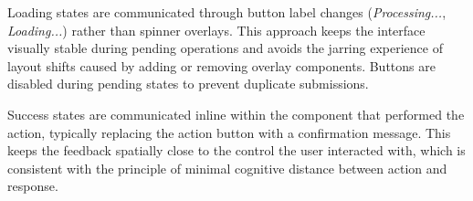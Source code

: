 \par Loading states are communicated through button label changes (\emph{Processing...}, \emph{Loading...}) rather than spinner overlays. This approach keeps the interface visually stable during pending operations and avoids the jarring experience of layout shifts caused by adding or removing overlay components. Buttons are disabled during pending states to prevent duplicate submissions.

\par Success states are communicated inline within the component that performed the action, typically replacing the action button with a confirmation message. This keeps the feedback spatially close to the control the user interacted with, which is consistent with the principle of minimal cognitive distance between action and response.

